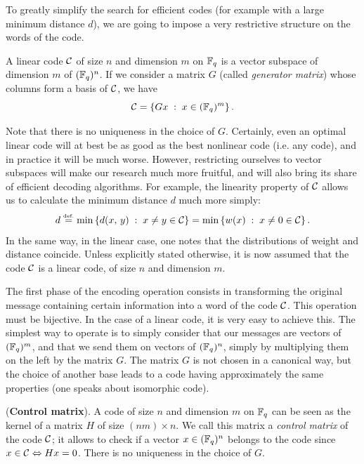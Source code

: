  
 
To greatly simplify the search for efficient codes (for example with a large minimum distance $ d $), we are going to impose a very restrictive structure on the words of the code.
 
\begin{defn}
  A linear code $ \mathcal{C} $ of size $ n $ and dimension $ m $ on $ \mathbb{F}_q $ is a vector subspace of dimension $ m $ of $ (\mathbb{F}_q)^n $. If we consider a matrix $ G $ (called \textit{generator matrix}) whose columns form a basis of $ \mathcal{C} $, we have
\begin{equation*}
\mathcal{C} = \left\{ G x \;:\; x \in (\mathbb{F}_q)^m \right\}.
\end{equation*}
\end{defn}
 Note that there is no uniqueness in the choice of $ G $. Certainly, even an optimal linear code will at best be as good as the best nonlinear code (i.e. any code), and in practice it will be much worse. However, restricting ourselves to vector subspaces will make our research much more fruitful, and will also bring its share of efficient decoding algorithms. For example, the linearity property of $ \mathcal{C} $ allows us to calculate the minimum distance $ d $ much more simply:
\begin{equation*}
d \stackrel{\mbox{\upshape\tiny def.}}{=} \min \left\{ d (x, \, y) \;:\; x \neq y \in \mathcal{C} \right\} = \min \left\{ w (x) \;:\; x \neq 0 \in \mathcal{C} \right\}.
\end{equation*}
In the same way, in the linear case, one notes that the distributions of weight and distance coincide. Unless explicitly stated otherwise, it is now assumed that the code $ \mathcal{C} $ is a linear code, of size $ n $ and dimension $ m $.
 
 
The first phase of the encoding operation consists in transforming the original message containing certain information into a word of the code $ \mathcal{C} $. This operation must be bijective. In the case of a linear code, it is very easy to achieve this. The simplest way to operate is to simply consider that our messages are  vectors of $ (\mathbb{F}_q)^m $, and that we send them on  vectors of $ (\mathbb{F}_q)^n $, simply by multiplying them on the left by the matrix $ G $. The matrix $ G $ is not chosen in a canonical way, but the choice of another base leads to a code having approximately the same properties (one speaks about isomorphic code).
 
\begin{rem}{(\upshape \textbf{Control matrix}).}
\label{rmk-matrices-control}
 A code of size $ n $ and dimension $ m $ on $ \mathbb{F}_q $ can be seen as the kernel of a matrix $ H $ of size $ (nm) \times n $. We call this matrix a \textit{control matrix} of the code $ \mathcal{C} $; it allows to check if a vector $ x \in (\mathbb{F}_q)^n $ belongs to the code since $ x \in \mathcal{C} \Leftrightarrow H x = 0 $. There is no uniqueness in the choice of $ G $.
\end{rem}
 
